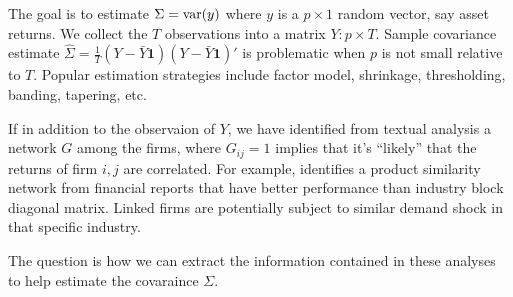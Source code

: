 The goal is to estimate \(\Sigma =\operatorname{var}(y)\) where \(y\) is a \(p \times 1\) random vector, say asset returns. We collect the \(T\) observations into a matrix \(Y:p\times T\). Sample covariance estimate \(\hat{\Sigma} = \frac{1}{T} (Y - \bar{Y}\mathbf{1})(Y - \bar{Y}\mathbf{1})'\) is problematic when \(p\) is not small relative to \(T\). Popular estimation strategies include factor model, shrinkage, thresholding, banding, tapering, etc. 

If in addition to the observaion of \(Y\), we have identified from textual analysis a network \(G\) among the firms, where \(G_{ij} = 1\) implies that it's ``likely'' that the returns of firm \(i,j\) are correlated. For example, \cite{hoberg2016TextBasedNetwork} identifies a product similarity network from financial reports that have better performance than industry block diagonal matrix. Linked firms are potentially subject to similar demand shock in that specific industry. 

The question is how we can extract the information contained in these analyses to help estimate the covaraince \(\Sigma\). 

